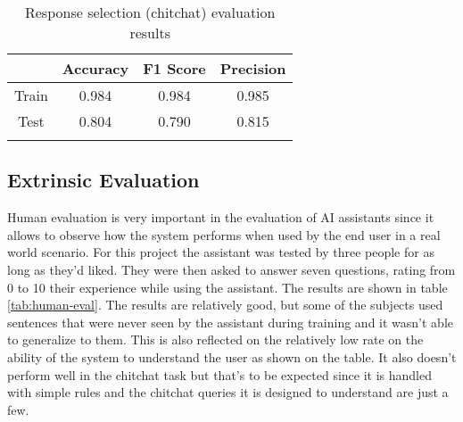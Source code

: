 \documentclass[journal, 11pt]{IEEEtran}
\begin{document}
\begin{table}[ht]
    \centering
    \begin{tabular}{@{}cccc@{}}
        \toprule
        \textbf{} & \textbf{Accuracy} & \textbf{F1 Score} & \textbf{Precision} \\ \midrule
        Train     & 0.984             & 0.984             & 0.985              \\
        Test      & 0.804             & 0.790             & 0.815              \\ \bottomrule\\
    \end{tabular}
    \caption{Response selection (chitchat) evaluation results}
    \label{tab:chitchat-eval}
\end{table}

\subsection{Extrinsic Evaluation}
Human evaluation is very important in the evaluation of AI assistants since it allows to observe how the system performs when used by the end user in a real world scenario.
For this project the assistant was tested by three people for as long as they'd liked. They were then asked to answer seven questions, rating from 0 to 10 their experience while using the assistant.
The results are shown in table \ref{tab:human-eval}.
The results are relatively good, but some of the subjects used sentences that were never seen by the assistant during training and it wasn't able to generalize to them. This is also reflected on the relatively low rate on the ability of the system to understand the user as shown on the table.
It also doesn't perform well in the chitchat task but that's to be expected since it is handled with simple rules and the chitchat queries it is designed to understand are just a few.
\end{document}
